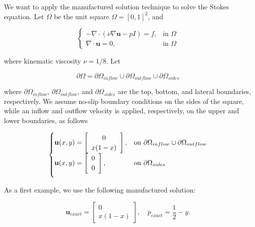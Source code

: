 \documentclass[a4paper,11pt,openright,twoside]{book}
\begin{document}
We want to apply the manufactured solution technique to solve the Stokes equation. Let $\Omega$ be the unit square $\Omega = [0,1]^2$, and

\vspace{0.2cm}
\[
\begin{cases}
- \nabla \cdot (\nu \nabla \mathbf{u} - pI) = f, & \mbox{in } \Omega \\
\nabla \cdot \mathbf{u} = 0, & \mbox{in } \Omega
\end{cases}
\]
\vspace{0.2cm}

where kinematic viscosity $\nu = 1/8$. Let

\[
\partial \Omega = \partial \Omega_{inflow} \cup \partial \Omega_{outflow} \cup \partial \Omega_{sides}
\]

where $\partial \Omega_{inflow}$, $\partial \Omega_{outflow}$, and $\partial \Omega_{sides}$ are the top, bottom, and lateral boundaries, respectively. We assume no-slip boundary conditions on the sides of the square, while an inflow and outflow velocity is applied, respectively, on the upper and lower boundaries, as follows

\[
\begin{cases}
\mathbf{u}(x,y) = \left[ \begin{array}{c} 0 \\ x(1-x) \end{array} \right] , & \mbox{on } \partial \Omega_{inflow} \cup \partial \Omega_{outflow} \\

\vspace{.2cm}

\mathbf{u}(x,y) = \left[ \begin{array}{c} 0 \\ 0 \end{array} \right], & \mbox{on } \partial \Omega_{sides}
\end{cases}
\]



As a first example, we use the following manufactured solution:

\[
\mathbf{u}_{exact} = \left[ \begin{array}{c} 0 \\ x(1-x) \end{array} \right], \quad
p_{exact} = \frac{1}{2}-y.
\]


\begin{center}
\end{center}
\end{document}

